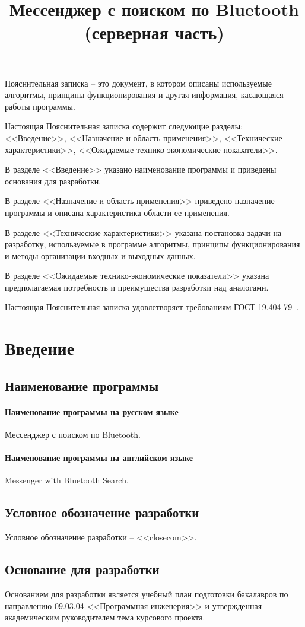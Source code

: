 \documentclass[explnote]{espd}
\title{Мессенджер с поиском по Bluetooth\\(серверная часть)}
\begin{document}
\annotation
Пояснительная записка -- это документ, в котором описаны используемые алгоритмы, принципы функционирования и другая информация, касающаяся работы программы.

Настоящая Пояснительная записка содержит следующие разделы: <<Введение>>, <<Назначение и область применения>>, <<Технические характеристики>>, <<Ожидаемые технико-экономические показатели>>.

В разделе <<Введение>> указано наименование программы и приведены основания для разработки.

В разделе <<Назначение и область применения>> приведено назначение программы и описана характеристика области ее применения.

В разделе <<Технические характеристики>> указана постановка задачи на разработку, используемые в программе алгоритмы, принципы функционирования и методы организации входных и выходных данных.

В разделе <<Ожидаемые технико-экономические показатели>> указана предполагаемая потребность и преимущества разработки над аналогами.

Настоящая Пояснительная записка удовлетворяет требованиям ГОСТ 19.404-79~\cite{espd404}.

\tableofcontents

\section{Введение}
\subsection{Наименование программы}
\paragraph{Наименование программы на русском языке}
Мессенджер с поиском по Bluetooth.
\paragraph{Наименование программы на английском языке}
Messenger with Bluetooth Search.

\subsection{Условное обозначение разработки}
Условное обозначение разработки -- <<closecom>>.

\subsection{Основание для разработки}
Основанием для разработки является учебный план подготовки бакалавров по направлению 09.03.04 <<Программная инженерия>> и утвержденная академическим руководителем тема курсового проекта.
\end{document}
